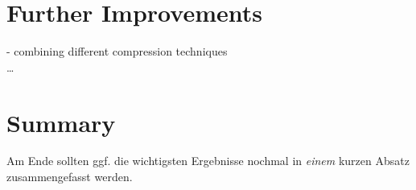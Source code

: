\section{Further Improvements}
\label{ch:Analysis:sec:Further Improvements}
- combining different compression techniques\\
\ldots


\section{Summary}
\label{ch:Analyse:sec:Summary}

Am Ende sollten ggf. die wichtigsten Ergebnisse nochmal in \emph{einem}
kurzen Absatz zusammengefasst werden.

